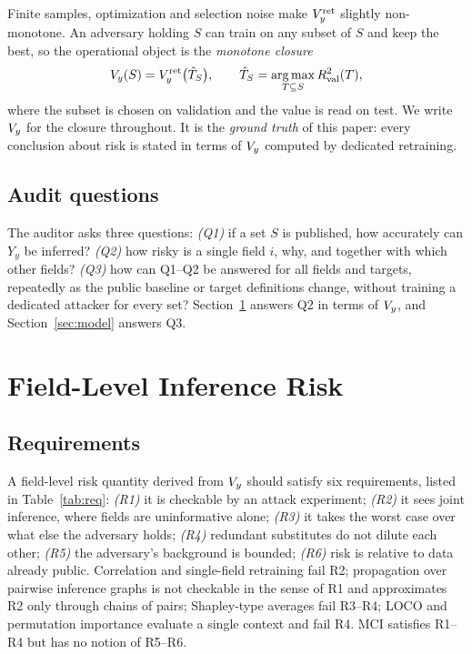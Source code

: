 Finite samples, optimization and selection noise make $V_{y}^{\mathrm{ret}}$ slightly
non-monotone. An adversary holding $S$ can train on any subset of $S$ and keep the best, so
the operational object is the \emph{monotone closure}
\begin{equation}\label{eq:closure}
V_{y}(S) = V_{y}^{\mathrm{ret}}\big(\hat T_S\big), \qquad
\hat T_S = \operatorname*{arg\,max}_{T \subseteq S} R^{2}_{\mathrm{val}}(T),
\end{equation}
where the subset is chosen on validation and the value is read on test. We write $V_{y}$ for
the closure throughout. It is the \emph{ground truth} of this paper: every conclusion about
risk is stated in terms of $V_{y}$ computed by dedicated retraining.

\subsection{Audit questions}
The auditor asks three questions: \emph{(Q1)} if a set $S$ is published, how accurately can
$Y_y$ be inferred? \emph{(Q2)} how risky is a single field $i$, why, and together with which
other fields? \emph{(Q3)} how can Q1--Q2 be answered for all fields and targets, repeatedly as
the public baseline or target definitions change, without training a dedicated attacker for
every set? Section~\ref{sec:mk} answers Q2 in terms of $V_{y}$, and Section~\ref{sec:model}
answers Q3.

\section{Field-Level Inference Risk}\label{sec:mk}

\subsection{Requirements}
A field-level risk quantity derived from $V_{y}$ should satisfy six requirements, listed in
Table~\ref{tab:req}: \emph{(R1)} it is checkable by an attack experiment; \emph{(R2)} it sees
joint inference, where fields are uninformative alone; \emph{(R3)} it takes the worst case over
what else the adversary holds; \emph{(R4)} redundant substitutes do not dilute each other;
\emph{(R5)} the adversary's background is bounded; \emph{(R6)} risk is relative to data already
public. Correlation and single-field retraining fail R2; propagation over pairwise inference
graphs is not checkable in the sense of R1 and approximates R2 only through chains of pairs;
Shapley-type averages fail R3--R4; LOCO and permutation importance evaluate a single context
and fail R4. MCI satisfies R1--R4 but has no notion of R5--R6.

